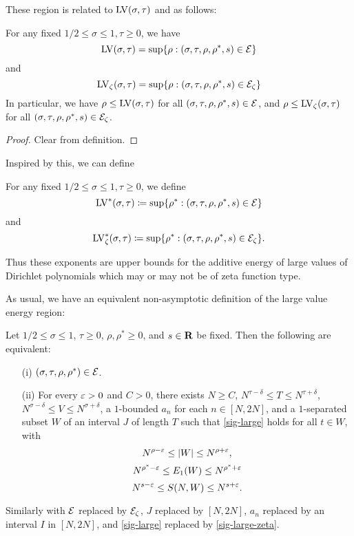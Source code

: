 These region is related to $\mathrm{LV}(\sigma,\tau)$ and as follows:

\begin{lemma} For any fixed $1/2 \leq \sigma \leq 1, \tau \geq 0$, we have
$$ \mathrm{LV}(\sigma,\tau) = \sup \{ \rho: (\sigma,\tau,\rho,\rho^*,s) \in \mathcal{E}\}$$
and
$$ \mathrm{LV}_\zeta(\sigma,\tau) = \sup \{ \rho: (\sigma,\tau,\rho,\rho^*,s) \in \mathcal{E}_\zeta\}$$
In particular, we have $\rho \leq \mathrm{LV}(\sigma,\tau)$ for all $(\sigma,\tau,\rho,\rho^*,s) \in \mathcal{E}$, and $\rho \leq \mathrm{LV}_\zeta(\sigma,\tau)$ for all $(\sigma,\tau,\rho,\rho^*,s) \in \mathcal{E}_\zeta$.
\end{lemma}

\begin{proof} Clear from definition.
\end{proof}

Inspired by this, we can define

\begin{definition}\label{lvze-def}  For any fixed $1/2 \leq \sigma \leq 1, \tau \geq 0$, we define
$$ \mathrm{LV}^*(\sigma,\tau) \coloneqq \sup \{ \rho^*: (\sigma,\tau,\rho,\rho^*,s) \in \mathcal{E}\}$$
and
$$ \mathrm{LV}^*_\zeta(\sigma,\tau) \coloneqq \sup \{ \rho^*: (\sigma,\tau,\rho,\rho^*,s) \in \mathcal{E}_\zeta\}.$$
\end{definition}

Thus these exponents are upper bounds for the additive energy of large values of Dirichlet polynomials which may or may not be of zeta function type.

As usual, we have an equivalent non-asymptotic definition of the large value energy region:

\begin{lemma}\label{lve-asymp} Let $1/2 \leq \sigma \leq 1$, $\tau \geq 0$,  $\rho, \rho^* \geq 0$, and $s \in \mathbf{R}$ be fixed.  Then the following are equivalent:
    \begin{itemize}
    \item[(i)] $(\sigma,\tau,\rho,\rho^*) \in \mathcal{E}$.
    \item[(ii)] For every $\varepsilon>0$ and $C > 0$, there exists $N \geq C$, $N^{\tau-\delta} \leq T \leq N^{\tau+\delta}$, $N^{\sigma-\delta} \leq V \leq N^{\sigma+\delta}$, a $1$-bounded $a_n$ for each $n \in [N,2N]$, and a $1$-separated subset $W$  of an interval $J$ of length $T$ such that \eqref{sig-large}
holds for all $t \in W$, with
    $$ N^{\rho-\varepsilon} \leq |W| \leq N^{\rho+\varepsilon},$$
    $$ N^{\rho^*-\varepsilon} \leq E_1(W) \leq N^{\rho^*+\varepsilon}$$
    $$ N^{s-\varepsilon} \leq S(N, W) \leq N^{s+\varepsilon}.$$
    \end{itemize}
    Similarly with $\mathcal{E}$ replaced by $\mathcal{E}_\zeta$, $J$ replaced by $[N,2N]$, $a_n$ replaced by an interval $I$ in $[N,2N]$, and \eqref{sig-large} replaced by \eqref{sig-large-zeta}.
\end{lemma}

